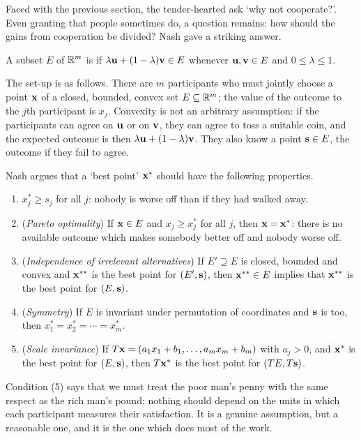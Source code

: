 \documentclass[a4paper]{scrartcl}
\begin{document}
Faced with the previous section, the tender-hearted ask `why not cooperate?'. Even granting that people sometimes do, a question remains: how should the gains from cooperation be divided? Nash gave a striking answer.

\begin{definition}
	A subset $E$ of $\mathbb{R}^m$ is  if $\lambda\mathbf{u} + (1-\lambda)\mathbf{v} \in E$ whenever $\mathbf{u},\mathbf{v}\in E$ and $0\leq \lambda\leq 1$.
\end{definition}

The set-up is as follows. There are $m$ participants who must jointly choose a point $\mathbf{x}$ of a closed, bounded, convex set $E \subseteq \mathbb{R}^m$; the value of the outcome to the $j$th participant is $x_j$. Convexity is not an arbitrary assumption: if the participants can agree on $\mathbf{u}$ or on $\mathbf{v}$, they can agree to toss a suitable coin, and the expected outcome is then $\lambda\mathbf{u}+(1-\lambda)\mathbf{v}$. They also know a  point $\mathbf{s} \in E$, the outcome if they fail to agree.

Nash argues that a `best point' $\mathbf{x}^*$ should have the following properties.
\begin{enumerate}[label=(\arabic*)]
	\item $x^*_j \geq s_j$ for all $j$: nobody is worse off than if they had walked away.
	\item (\emph{Pareto optimality}) If $\mathbf{x} \in E$ and $x_j \geq x_j^*$ for all $j$, then $\mathbf{x}=\mathbf{x}^*$: there is no available outcome which makes somebody better off and nobody worse off.
	\item (\emph{Independence of irrelevant alternatives}) If $E' \supseteq E$ is closed, bounded and convex and $\mathbf{x}^{**}$ is the best point for $(E',\mathbf{s})$, then $\mathbf{x}^{**}\in E$ implies that $\mathbf{x}^{**}$ is the best point for $(E,\mathbf{s})$.
	\item (\emph{Symmetry}) If $E$ is invariant under permutation of coordinates and $\mathbf{s}$ is too, then $x_1^*=x_2^*=\cdots=x_m^*$.
	\item (\emph{Scale invariance}) If $T\mathbf{x} = (a_1x_1+b_1,\ldots,a_mx_m+b_m)$ with $a_j>0$, and $\mathbf{x}^*$ is the best point for $(E,\mathbf{s})$, then $T\mathbf{x}^*$ is the best point for $(TE, T\mathbf{s})$.
\end{enumerate}
Condition (5) says that we must treat the poor man's penny with the same respect as the rich man's pound: nothing should depend on the units in which each participant measures their satisfaction. It is a genuine assumption, but a reasonable one, and it is the one which does most of the work.
\end{document}
